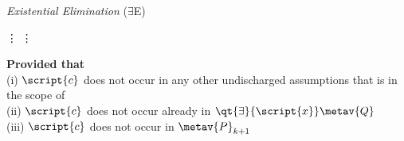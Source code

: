 \begin{multicols}{2}
\textit{Existential Elimination} ($\exists$E)

\begin{fitchproof}
	 {\hspace{2em} \vdots}
	\open	
		 
		 {\hspace{2em} \vdots}
	\close
	 
\end{fitchproof}

\textbf{Provided that} \\
(i)  $\script{c}$ does not occur in any other undischarged assumptions that  is in the scope of \\
(ii) $\script{c}$ does not occur already in $\qt{\exists}{\script{x}} \metav{Q}$ \\
(iii) $\script{c}$ does not occur in $\metav{P}_{k+1}$ \\


\end{multicols} %
